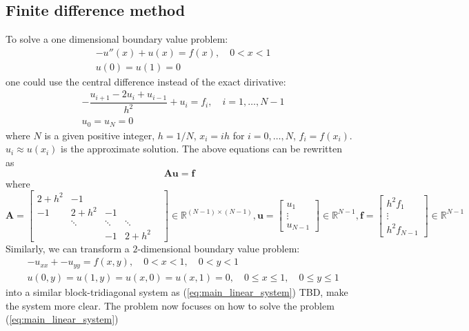 \documentclass[onecolumn, conference]{IEEEtran}
\begin{document}
\subsection{Finite difference method}
To solve a one dimensional boundary value problem:
\begin{align}
    &-u''(x)+u(x)=f(x),\quad 0<x<1\\
    &u(0)=u(1)=0
\end{align}
one could use the central difference instead of the exact dirivative:
\begin{align}
    &-\dfrac{u_{i+1}-2u_i+u_{i-1}}{h^2}+ u_i=f_i,\quad i=1,\dots,N-1\\
    &u_0=u_N=0
\end{align} 
where $N$ is a given positive integer, $h=1/N$, $x_i=ih$ for $i=0,\dots,N$, $f_i=f(x_i)$. $u_i\approx u(x_i)$ is the approximate solution. The above equations can be rewritten as 
\begin{equation}
    \label{eq:main_linear_system}
    \mathbf{A}\mathbf{u}=\mathbf{f}
\end{equation}
where 
\begin{equation}
    \mathbf{A}=\begin{bmatrix}
        2+h^2& -1& & & \\
        -1& 2+h^2& -1& &\\
        & \ddots& \ddots& \ddots&\\
        & &-1& 2+h^2&
    \end{bmatrix}\in\mathbb{R}^{(N-1)\times(N-1)},\mathbf{u}=\begin{bmatrix}
        u_1\\
        \vdots\\
        u_{N-1}
    \end{bmatrix}\in\mathbb{R}^{N-1},\mathbf{f}=\begin{bmatrix}
        h^2f_1\\
        \vdots\\
        h^2f_{N-1}
    \end{bmatrix}\in\mathbb{R}^{N-1}
\end{equation}
Similarly, we can transform a $2$-dimensional boundary value problem:
\begin{align}
    &-u_{xx}+-u_{yy}=f(x,y),\quad 0<x<1,\quad 0<y<1\\
    &u(0,y)=u(1,y)=u(x,0)=u(x,1)=0,\quad 0\leq x\leq1,\quad 0\leq y\leq1
\end{align}
into a similar block-tridiagonal system as (\ref{eq:main_linear_system}) {\color{blue} TBD, make the system more clear}. The problem now focuses on how to solve the problem (\ref{eq:main_linear_system})
\end{document}
